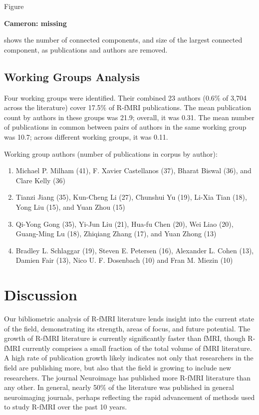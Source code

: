 \documentclass[5p]{elsarticle}
\newcommand\MyCBox[1]{%
  \colorbox{yellow!60}{\begin{varwidth}{\dimexpr\linewidth-2\fboxsep}#1\end{varwidth}}}
\newcommand{\COMMENTCC}[1]{\MyCBox{\textcolor{cc_commentcolor}{\textbf{Cameron:
#1}}}}
\begin{document}
Figure \COMMENTCC{missing} shows the number of connected components, and size of the largest
connected component, as publications and authors are removed.  

\subsection{Working Groups Analysis}
Four working groups were identified. Their
combined 23 authors (0.6\% of 3,704 across the literature) cover 17.5\% of R-fMRI
publications. The mean publication count by authors in these groups was 21.9;
overall, it was 0.31. The mean number of publications in common between pairs of
authors in the same working group was 10.7; across different working groups, it
was 0.11.  

Working group authors (number of publications in corpus by author):
\begin{enumerate}
\item Michael P. Milham (41), F. Xavier Castellanos (37), Bharat Biswal (36), and 
Clare Kelly (36)
\item Tianzi Jiang (35), Kun-Cheng Li (27), Chunshui Yu (19),
Li-Xia Tian (18), Yong Liu (15), and Yuan Zhou (15)
\item Qi-Yong Gong (35), Yi-Jun Liu (21), Hua-fu Chen (20), Wei Liao (20), 
Guang-Ming Lu (18), Zhiqiang Zhang (17), and Yuan Zhong (13) 
\item Bradley L. Schlaggar (19), Steven E. Petersen (16), Alexander L.
Cohen (13), Damien Fair (13), Nico U. F. Dosenbach (10) and Fran M. Miezin (10)
\end{enumerate}

\section{Discussion}

Our bibliometric analysis of R-fMRI literature lends insight into the current
state of the field, demonstrating its strength, areas of focus, and future
potential. The growth of R-fMRI literature is currently significantly faster
than fMRI, though R-fMRI currently comprises a small fraction of the total
volume of fMRI literature. A high rate of publication growth likely indicates
not only that researchers in the field are publishing more, but also that the
field is growing to include new researchers.  The journal Neuroimage has
published more R-fMRI literature than any other. In general, nearly 50\% of the
literature was published in general neuroimaging journals, perhaps reflecting
the rapid advancement of methods used to study R-fMRI over the past 10 years. 
\end{document}
